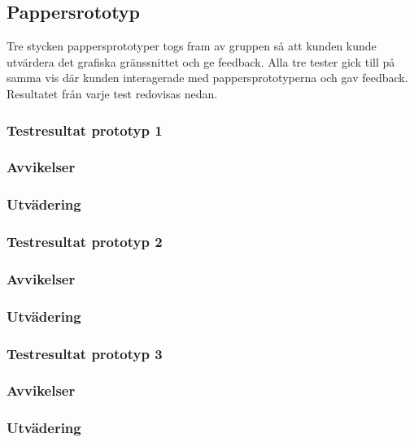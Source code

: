 \documentclass[a4paper,10pt]{article}
\begin{document}
\subsection{Pappersrototyp}
Tre stycken pappersprototyper togs fram av gruppen så att kunden kunde utvärdera det grafiska gränssnittet och ge feedback. Alla tre tester gick till på samma vis där kunden interagerade med pappersprototyperna och gav feedback. Resultatet från varje test redovisas nedan.
\subsubsection{Testresultat prototyp 1}
\subsubsection{Avvikelser}
\subsubsection{Utvädering}
\subsubsection{Testresultat prototyp 2}
\subsubsection{Avvikelser}
\subsubsection{Utvädering}
\subsubsection{Testresultat prototyp 3}
\subsubsection{Avvikelser}
\subsubsection{Utvädering}
\end{document}
